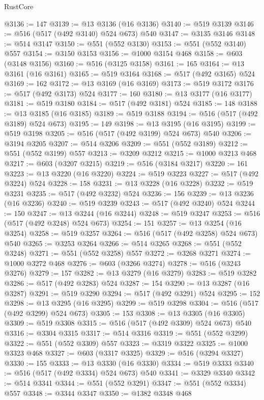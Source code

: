\begin{lexlean}{RustCore}
\begin{coremodule}
@3136 := 147
@3139 := @13 @3136 (@16 @3136)
@3140 := @519 @3139
@3146 := @516 (@517 (@492 @3140) @524 @673) @540
@3147 := @3135 @3146
@3148 := @514 @3147
@3150 := @551 (@552 @3130)
@3153 := @551 (@552 @3140) @557
@3154 := @3150 @3153
@3156 := @1000 @3154 @468
@3158 := @603 (@3148 @3156)
@3160 := @516 (@3125 @3158)
@3161 := 165
@3164 := @13 @3161 (@16 @3161)
@3165 := @519 @3164
@3168 := @517 (@492 @3165) @524
@3169 := 162
@3172 := @13 @3169 (@16 @3169)
@3173 := @519 @3172
@3176 := @517 (@492 @3173) @524
@3177 := 160
@3180 := @13 @3177 (@16 @3177)
@3181 := @519 @3180
@3184 := @517 (@492 @3181) @524
@3185 := 148
@3188 := @13 @3185 (@16 @3185)
@3189 := @519 @3188
@3194 := @516 (@517 (@492 @3189) @524 @673)
@3195 := 149
@3198 := @13 @3195 (@16 @3195)
@3199 := @519 @3198
@3205 := @516 (@517 (@492 @3199) @524 @673) @540
@3206 := @3194 @3205
@3207 := @514 @3206
@3209 := @551 (@552 @3189)
@3212 := @551 (@552 @3199) @557
@3213 := @3209 @3212
@3215 := @1000 @3213 @468
@3217 := @603 (@3207 @3215)
@3219 := @516 (@3184 @3217)
@3220 := 161
@3223 := @13 @3220 (@16 @3220)
@3224 := @519 @3223
@3227 := @517 (@492 @3224) @524
@3228 := 158
@3231 := @13 @3228 (@16 @3228)
@3232 := @519 @3231
@3235 := @517 (@492 @3232) @524
@3236 := 156
@3239 := @13 @3236 (@16 @3236)
@3240 := @519 @3239
@3243 := @517 (@492 @3240) @524
@3244 := 150
@3247 := @13 @3244 (@16 @3244)
@3248 := @519 @3247
@3253 := @516 (@517 (@492 @3248) @524 @673)
@3254 := 151
@3257 := @13 @3254 (@16 @3254)
@3258 := @519 @3257
@3264 := @516 (@517 (@492 @3258) @524 @673) @540
@3265 := @3253 @3264
@3266 := @514 @3265
@3268 := @551 (@552 @3248)
@3271 := @551 (@552 @3258) @557
@3272 := @3268 @3271
@3274 := @1000 @3272 @468
@3276 := @603 (@3266 @3274)
@3278 := @516 (@3243 @3276)
@3279 := 157
@3282 := @13 @3279 (@16 @3279)
@3283 := @519 @3282
@3286 := @517 (@492 @3283) @524
@3287 := 154
@3290 := @13 @3287 (@16 @3287)
@3291 := @519 @3290
@3294 := @517 (@492 @3291) @524
@3295 := 152
@3298 := @13 @3295 (@16 @3295)
@3299 := @519 @3298
@3304 := @516 (@517 (@492 @3299) @524 @673)
@3305 := 153
@3308 := @13 @3305 (@16 @3305)
@3309 := @519 @3308
@3315 := @516 (@517 (@492 @3309) @524 @673) @540
@3316 := @3304 @3315
@3317 := @514 @3316
@3319 := @551 (@552 @3299)
@3322 := @551 (@552 @3309) @557
@3323 := @3319 @3322
@3325 := @1000 @3323 @468
@3327 := @603 (@3317 @3325)
@3329 := @516 (@3294 @3327)
@3330 := 155
@3333 := @13 @3330 (@16 @3330)
@3334 := @519 @3333
@3340 := @516 (@517 (@492 @3334) @524 @673) @540
@3341 := @3329 @3340
@3342 := @514 @3341
@3344 := @551 (@552 @3291)
@3347 := @551 (@552 @3334) @557
@3348 := @3344 @3347
@3350 := @1382 @3348 @468

\end{coremodule}
\end{lexlean}
